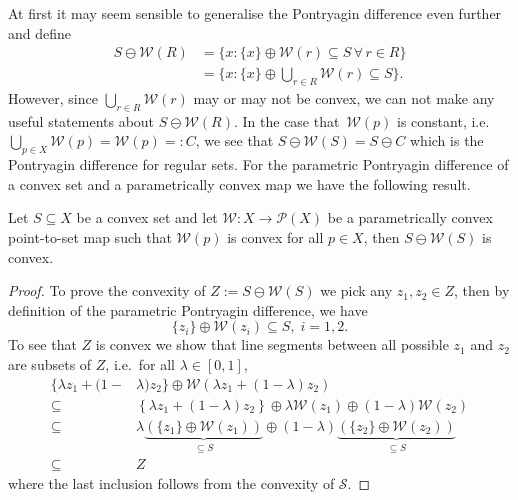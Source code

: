 %
At first it may seem sensible to generalise the Pontryagin difference even further and define
%
\begin{equation}\label{eq:extended:parametric:pontryagin:difference}
\begin{split}
	S\ominus \mathcal W(R) &= \{x:\{x\}\oplus \mathcal W(r)\subseteq S\,\forall\, r\in R\}\\
	&=\{x:\{x\}\oplus\bigcup_{r\in R} \mathcal W(r)\subseteq S\}.
\end{split}
\end{equation}
%
However, since $\bigcup_{r\in R} \mathcal W(r)$ may or may not be convex, we can not make any useful
statements about $S\ominus \mathcal W(R)$. 
%
In the case that~$\mathcal W(p)$ is constant, i.e. $\bigcup_{p\in X}\mathcal W(p)=\mathcal W(p)=:C$,
we see that $S\ominus \mathcal W(S)=S\ominus C$ which is the Pontryagin difference for regular sets.
%
For the parametric Pontryagin difference of a convex set and a parametrically convex map we 
have the following result.
%
\begin{thm}\label{thm:convexity:of:pontryagin:difference}
  Let $S\subseteq X$ be a convex set and let $\mathcal W:X\rightarrow\mathcal P(X)$ be a parametrically convex point-to-set
  map such that $\mathcal W(p)$ is convex for all $p\in X$, then $S\ominus \mathcal W(S)$ is convex.
\end{thm}
%
\begin{proof}
To prove the convexity of $ Z :=  S\ominus \mathcal W( S)$ we pick any $z_1,z_2\in Z$, then
by definition of the parametric Pontryagin difference, we have
%
\begin{equation}
	\{z_i\} \oplus \mathcal W(z_i) \subseteq S,\; i=1,2.
\end{equation}
%
To see that $ Z$ is convex we show that line segments between
all possible $z_1$ and $z_2$ are subsets of $ Z$, i.e.~for all $\lambda \in [0,1]$,
\begin{equation}
\begin{aligned}
	\{ \lambda z_1 + (1-&\lambda)z_2
	\}\oplus \mathcal W\left( \lambda z_1 + (1-\lambda)z_2\right)\\
	\subseteq&\left\{ \lambda z_1 + (1-\lambda)z_2
	\right\}\oplus \lambda \mathcal W(z_1) \oplus (1-\lambda)
	\mathcal W(z_2)\\
	\subseteq &\lambda\underbrace{(\{z_1\}\oplus \mathcal W(z_1))}_{\subseteq S}\oplus
	(1-\lambda)\underbrace{(\{z_2\}\oplus \mathcal W(z_2))}_{\subseteq S}\\
	\subseteq& Z
\end{aligned}
\end{equation}
%
where the last inclusion follows from the convexity of $\mathcal S$.
\end{proof}
